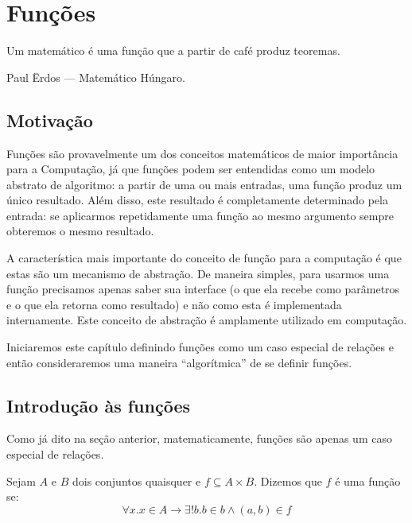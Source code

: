 \chapter{Funções}\label{cap8}

\epigraph{Um matemático é uma função que a partir de café produz
  teoremas.}{Paul Ërdos --- Matemático Húngaro.}

\section{Motivação}

Funções são provavelmente um dos conceitos matemáticos de maior
importância para a Computação, já que funções podem ser entendidas
como um modelo abstrato de algoritmo: a partir de uma ou mais
entradas, uma função produz um único resultado. Além disso, este
resultado é completamente determinado pela entrada: se aplicarmos
repetidamente uma função ao mesmo argumento sempre obteremos o mesmo
resultado.

A característica mais importante do conceito de função para a
computação é que estas são um mecanismo de abstração. De maneira
simples, para usarmos uma função precisamos apenas saber sua interface
(o que ela recebe como parâmetros e o que ela retorna como resultado)
e não como esta é implementada internamente. Este conceito de
abstração é amplamente utilizado em computação.

Iniciaremos este capítulo definindo funções como um caso especial de
relações e então consideraremos uma maneira ``algorítmica'' de se
definir funções.

\section{Introdução às funções}

Como já dito na seção anterior, matematicamente, funções são apenas um
caso especial de relações.

\begin{Definition}[Função]
Sejam $A$ e $B$ dois conjuntos quaisquer e $f \subseteq A \times
B$. Dizemos que $f$ é uma função se:
\[
\forall x. x\in A \to \exists ! b. b\in b \land (a,b) \in f
\]
\end{Definition}

